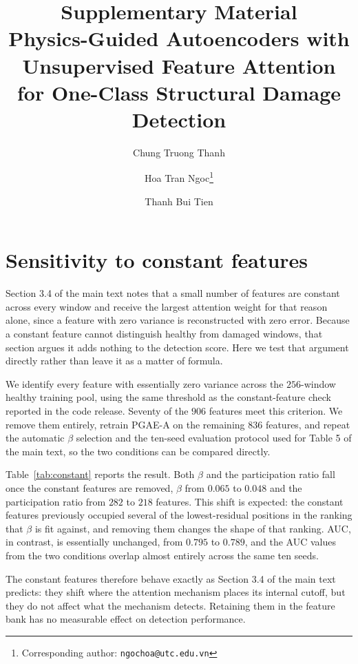 \documentclass[11pt,a4paper]{article}
\title{\textbf{Supplementary Material}\\[4pt]
\large Physics-Guided Autoencoders with Unsupervised Feature
Attention for One-Class Structural Damage Detection}
\author[1,2]{Chung Truong Thanh}
\author[1]{Hoa Tran Ngoc\thanks{Corresponding author: \texttt{ngochoa@utc.edu.vn}}}
\author[1]{Thanh Bui Tien}
\affil[1]{University of Transport and Communications, No.\ 3 Cau Giay Street, Hanoi, Vietnam}
\affil[2]{Nha Trang University, 02 Nguyen Dinh Chieu, Khanh Hoa, Vietnam}
\date{}
\begin{document}
\maketitle
\vspace{-2em}

\section{Sensitivity to constant features}
\label{sec:constant}

Section 3.4 of the main text notes that a small number of features are
constant across every window and receive the largest attention weight for
that reason alone, since a feature with zero variance is reconstructed with
zero error. Because a constant feature cannot distinguish healthy from
damaged windows, that section argues it adds nothing to the detection score.
Here we test that argument directly rather than leave it as a matter of
formula.

We identify every feature with essentially zero variance across the
$256$-window healthy training pool, using the same threshold as the
constant-feature check reported in the code release. Seventy of the $906$
features meet this criterion. We remove them entirely, retrain PGAE-A on the
remaining $836$ features, and repeat the automatic $\beta$ selection and the
ten-seed evaluation protocol used for Table 5 of the main text, so the two
conditions can be compared directly.

Table~\ref{tab:constant} reports the result. Both $\beta$ and the
participation ratio fall once the constant features are removed, $\beta$
from $0.065$ to $0.048$ and the participation ratio from $282$ to $218$
features. This shift is expected: the constant features previously occupied
several of the lowest-residual positions in the ranking that $\beta$ is fit
against, and removing them changes the shape of that ranking. AUC, in
contrast, is essentially unchanged, from $0.795$ to $0.789$, and the AUC
values from the two conditions overlap almost entirely across the same ten
seeds.

The constant features therefore behave exactly as Section 3.4 of the main
text predicts: they shift where the attention mechanism places its internal
cutoff, but they do not affect what the mechanism detects. Retaining them in
the feature bank has no measurable effect on detection performance.
\end{document}
